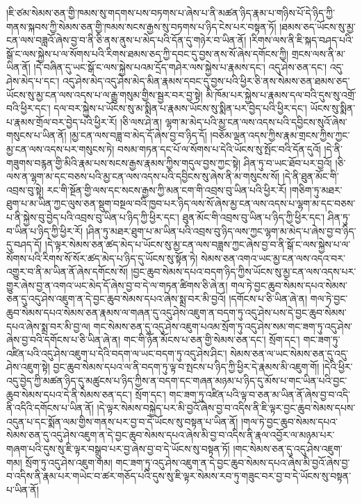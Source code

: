 །ཇི་ཙམ་སེམས་ཅན་གྱི་ཁམས་སུ་གདགས་པས་བཏགས་པ་ཞེས་པ་ནི་མཚན་ཉིད་རྣམ་པ་གཉིས་པོ་དེ་ཉིད་ཀྱི་གནས་སྐབས་ཀྱི་སེམས་ཅན་གྱི་ཁམས་སངས་རྒྱས་སུ་བཏགས་པ་ཉིད་ངེས་པར་བསྟན་ཏོ། །ཐམས་ཅད་ཡོངས་སུ་མྱ་ངན་ལས་བཟླའོ་ཞེས་བྱ་བ་ནི་ཅི་ནས་ནུས་པ་མེད་པའི་དོན་དུ་གཉེར་བ་ཡིན་ནོ། །རིགས་ལས་ནི་ཇི་སྐད་བཤད་པའི་སྒོ་ང་ལས་སྐྱེས་པ་ལ་སོགས་པའི་རིགས་ཐམས་ཅད་ཀྱི་དབང་དུ་བྱས་ནས་སོ་ཞེས་དགོངས་ཀྱི། གྲངས་ལས་ནི་མ་ཡིན་ནོ། །དེ་བཞིན་དུ་ཡང་སྒོ་ང་ལས་སྐྱེས་པའམ་དྲོད་གཤེར་ལས་སྐྱེས་པ་རྣམས་དང་། འདུ་ཤེས་ཅན་དང་། འདུ་ཤེས་མེད་པ་དང་། འདུ་ཤེས་མེད་འདུ་ཤེས་མེད་མིན་རྣམས་དབང་དུ་བྱས་པའི་ཕྱིར་ཅི་ནས་སེམས་ཅན་ཐམས་ཅད་ཡོངས་སུ་མྱ་ངན་ལས་འདས་པ་ལ་རྒྱུ་གསུམ་གྱིས་སྦྱར་བར་བྱ་སྟེ། མི་ཁོམ་པར་སྐྱེས་པ་རྣམས་དལ་བའི་དུས་སུ་འགྲོ་བའི་ཕྱིར་དང་། དལ་བར་སྐྱེས་པ་ཡོངས་སུ་མ་སྨིན་པ་རྣམས་ཡོངས་སུ་སྨིན་པར་བྱེད་པའི་ཕྱིར་དང་། ཡོངས་སུ་སྨིན་པ་རྣམས་གྲོལ་བར་བྱེད་པའི་ཕྱིར་རོ། །ཅི་ལས་ཤེ་ན། ལྷག་མ་མེད་པའི་མྱ་ངན་ལས་འདས་པའི་དབྱིངས་སུའོ་ཞེས་གསུངས་པ་ཡིན་ནོ། །མྱ་ངན་ལས་བཟླ་བ་མེད་དོ་ཞེས་བྱ་བ་ཉིད་དོ། །བཅོམ་ལྡན་འདས་ཀྱིས་རྣམ་གྲངས་ཀྱིས་ཀྱང་མྱ་ངན་ལས་འདས་པར་གསུངས་ཏེ། བསམ་གཏན་དང་པོ་ལ་སོགས་པ་དེའི་ཡོངས་སུ་སྤོང་བའི་དོན་དུའོ། །དེ་ནི་གཟུགས་བརྙན་གྱི་མིའི་རྣམ་པས་སངས་རྒྱས་རྣམས་ཀྱིས་གདུལ་བྱས་ཀྱང་སྟེ། ཤིན་ཏུ་བ་ཡང་ཐོབ་པར་བྱའོ། །ཅི་ལས་ན་ལྷག་མ་དང་བཅས་པའི་མྱ་ངན་ལས་འདས་པའི་དབྱིངས་སུ་ཞེས་ནི་མ་གསུངས་སོ། །དེ་ནི་ཐུན་མོང་གི་འབྲས་བུ་སྟེ། རང་གི་སྔོན་གྱི་ལས་དང་སངས་རྒྱས་ཀྱི་མན་ངག་གི་འབྲས་བུ་ཡིན་པའི་ཕྱིར་རོ། །གཅིག་ཏུ་མཐར་ཐུག་པ་མ་ཡིན་ཀྱང་ལུས་ཅན་སྡུག་བསྔལ་བའི་ཁྱབ་པར་ཉིད་ལས་སོ་ཞེས་མྱ་ངན་ལས་འདས་པ་ལྷག་མ་དང་བཅས་པ་ནི་སྐྱེས་བུ་བྱེད་པའི་འབྲས་བུ་ཡིན་པ་ཉིད་ཀྱི་ཕྱིར་དང་། ཐུན་མོང་གི་འབྲས་བུ་ཡིན་པ་ཉིད་ཀྱི་ཕྱིར་དང་། ཤིན་ཏུ་བ་ཡིན་པ་ཉིད་ཀྱི་ཕྱིར་རོ། །ཤིན་ཏུ་མཐར་ཐུག་པ་མ་ཡིན་པའི་འབྲས་བུ་ཉིད་ལས་ཀྱང་ལྷག་མ་མེད་པ་ཞེས་བྱ་བ་ཉིད་དུ་བཤད་དོ། །དེ་ལྟར་སེམས་ཅན་ཚད་མེད་པ་ཡོངས་སུ་མྱ་ངན་ལས་བཟླས་ཀྱང་ཞེས་བྱ་བ་ནི་སྒོ་ང་ལས་སྐྱེས་པ་ལ་སོགས་པའི་རིགས་སོ་སོར་ཚད་མེད་པ་ཉིད་དུ་ཡོངས་སུ་སྟོན་ཏེ། སེམས་ཅན་འགའ་ཡང་མྱ་ངན་ལས་འདའ་བར་འགྱུར་བ་ནི་མ་ཡིན་ནོ་ཞེས་དགོངས་སོ། །བྱང་ཆུབ་སེམས་དཔའ་བདག་ཉིད་ཀྱིས་ཡོངས་སུ་མྱ་ངན་ལས་འདས་པར་གྱུར་ཞེས་བྱ་ན་འགའ་ཡང་མེད་དོ་ཞེས་བྱ་བ་དེ་ལ་གཏན་ཚིགས་ཅི་ཞེ་ན། གལ་ཏེ་བྱང་ཆུབ་སེམས་དཔའ་སེམས་ཅན་དུ་འདུ་ཤེས་འཇུག་ན་དེ་བྱང་ཆུབ་སེམས་དཔའ་ཞེས་སྨྲ་བར་མི་བྱའོ། །དགོངས་པ་ཅི་ཡིན་ཞེ་ན། གལ་ཏེ་བྱང་ཆུབ་སེམས་དཔའ་སེམས་ཅན་རྣམས་ལ་གཞན་དུ་འདུ་ཤེས་འཇུག་ན་བདག་ཏུ་འདུ་ཤེས་པས་དེ་བྱང་ཆུབ་སེམས་དཔའ་ཞེས་སྨྲ་བར་མི་བྱ་ལ། གང་སེམས་ཅན་དུ་འདུ་ཤེས་འཇུག་པའམ་སྲོག་ཏུ་འདུ་ཤེས་སམ་གང་ཟག་ཏུ་འདུ་ཤེས་ཞེས་བྱ་བའི་དགོངས་པ་ཅི་ཡིན་ཞེ་ན། གང་གི་ཉོན་མོངས་པ་ཅན་གྱི་སེམས་ཅན་དང་། སྲོག་དང་། གང་ཟག་ཏུ་འཛིན་པའི་འདུ་ཤེས་འཇུག་པ་དེའི་བདག་ལ་ཡང་བདག་ཏུ་འདུ་ཤེས་ཤིང་། སེམས་ཅན་ལ་ཡང་སེམས་ཅན་དུ་འདུ་ཤེས་འཇུག་སྟེ། བྱང་ཆུབ་སེམས་དཔའ་ལ་ནི་བདག་ཏུ་ལྟ་བ་སྤངས་པ་ཉིད་ཀྱི་ཕྱིར་དེ་རྣམས་མི་འཇུག་གོ། །དེའི་ཕྱིར་འདུ་བྱེད་ཀྱི་མཚན་ཉིད་དུ་མཚུངས་པ་ཉིད་ཀྱིས་ན་བདག་དང་གཞན་མཉམ་པ་ཉིད་དུ་མོས་པ་གང་ཡིན་པའི་བྱང་ཆུབ་སེམས་དཔའ་དེ་ནི་སེམས་ཅན་དང་། སྲོག་དང་། གང་ཟག་ཏུ་འཛིན་པའི་ལྟ་བ་ཅན་མ་ཡིན་ནོ་ཞེས་བྱ་བ་འདི་ནི་འདིའི་དགོངས་པ་ཡིན་ནོ། །དེ་ལྟར་སེམས་བསྐྱེད་པར་མི་བྱའོ་ཞེས་བྱ་བ་འདིས་ནི་ཇི་ལྟར་བྱང་ཆུབ་སེམས་དཔས་འདུན་པ་དང་སྨོན་ལམ་གྱིས་གནས་པར་བྱ་བ་དེ་ཡོངས་སུ་བསྟན་པ་ཡིན་ནོ། །གལ་ཏེ་བྱང་ཆུབ་སེམས་དཔའ་སེམས་ཅན་དུ་འདུ་ཤེས་འཇུག་ན་དེ་བྱང་ཆུབ་སེམས་དཔའ་ཞེས་མི་བྱ་བ་འདིས་ནི་རྣལ་འབྱོར་ལ་མཉམ་པར་གཞག་པའི་དུས་སུ་ཇི་ལྟར་བསྒྲུབ་པར་བྱ་ཞེས་བྱ་བ་དེ་ཡོངས་སུ་བསྟན་ཏོ། །གང་སེམས་ཅན་དུ་འདུ་ཤེས་འཇུག་གམ། སྲོག་ཏུ་འདུ་ཤེས་འཇུག་གམ། གང་ཟག་ཏུ་འདུ་ཤེས་འཇུག་ན་དེ་བྱང་ཆུབ་སེམས་དཔའ་ཞེས་མི་བྱའོ་ཞེས་བྱ་བ་འདིས་ནི་རྣམ་པར་གཡེང་བ་ཚར་གཅོད་པའི་དུས་སུ་ཇི་ལྟར་སེམས་རབ་ཏུ་གཟུང་བར་བྱ་བ་དེ་ཡོངས་སུ་བསྟན་པ་ཡིན་ནོ། 